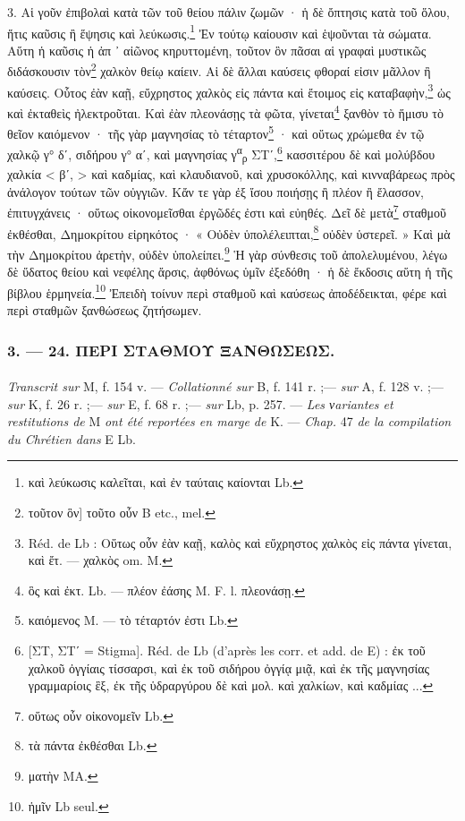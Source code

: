 \documentclass[a4paper, 11pt, oneside, polutonikogreek, french]{article}
\begin{document}
3. Αἱ γοῦν ἐπιβολαὶ κατὰ τῶν τοῦ θείου πάλιν ζωμῶν · ἡ δὲ ὄπτησις κατὰ τοῦ ὅλου, ἥτις καῦσις ἢ ἕψησις καὶ λεύκωσις.\footnote{καὶ λεύκωσις καλεῖται, καὶ ἐν ταύταις καίονται Lb.} Ἐν τούτῳ καίουσιν καὶ ἑψοῦνται τὰ σώματα. Αὕτη ἡ καῦσις ἡ ἀπ ᾽ αἰῶνος κηρυττομένη, τοῦτον ὃν πᾶσαι αἱ γραφαὶ μυστικῶς διδάσκουσιν τὸν\footnote{τοῦτον ὃν] τοῦτο οὖν B etc., mel.} χαλκὸν θείῳ καίειν. Αἱ δὲ ἄλλαι καύσεις φθοραί εἰσιν μᾶλλον ἢ καύσεις. Οὗτος ἐὰν καῇ, εὔχρηστος χαλκὸς εἰς πάντα καὶ ἔτοιμος εἰς καταβαφὴν,\footnote{Réd. de Lb : Οὕτως οὖν ἐὰν καῇ, καλὸς καὶ εὔχρηστος χαλκὸς εἰς πάντα γίνεται, καὶ ἔτ. --- χαλκὸς om. M.} ὡς καὶ ἐκταθεὶς ἠλεκτροῦται. Καὶ ἐὰν πλεονάσῃς τὰ φῶτα, γίνεται\footnote{ὃς καὶ ἐκτ. Lb. --- πλέον ἐάσης M. F. l. πλεονάσῃ.} ξανθὸν τὸ ἥμισυ τὸ θεῖον καιόμενον · τῆς γὰρ μαγνησίας τὸ τέταρτον\footnote{καιόμενος M. --- τὸ τέταρτόν ἐστι Lb.} · καὶ οὕτως χρώμεθα ἐν τῷ χαλκῷ γ° δʹ, σιδήρου γ° αʹ, καὶ μαγνησίας γ\textsuperscript{α}\textsubscript{ρ} ΣΤʹ,\footnote{[ΣΤ, ΣΤʹ = Stigma]. Réd. de Lb (d'après les corr. et add. de E) : ἐκ τοῦ χαλκοῦ ὀγγίαις τίσσαρσι, καὶ ἐκ τοῦ σιδήρου ὀγγίᾳ μιᾷ, καὶ ἐκ τῆς μαγνησίας γραμμαρίοις ἓξ, ἐκ τῆς ὑδραργύρου δὲ καὶ μολ. καὶ χαλκίων, καὶ καδμίας ...} κασσιτέρου δὲ καὶ μολύβδου χαλκία < βʹ, > καὶ καδμίας, καὶ κλαυδιανοῦ, καὶ χρυσοκόλλης, καὶ κινναβάρεως πρὸς ἀνάλογον τούτων τῶν οὐγγιῶν. Κἄν τε γὰρ ἐξ ἴσου ποιήσῃς ἢ πλέον ἢ ἔλασσον, ἐπιτυγχάνεις · οὕτως οἰκονομεῖσθαι ἐργῶδές ἐστι καὶ εὐηθές. Δεῖ δὲ μετὰ\footnote{οὕτως οὖν οἰκονομεῖν Lb.} σταθμοῦ ἐκθέσθαι, Δημοκρίτου εἰρηκότος · « Οὐδὲν ὑπολέλειπται,\footnote{τὰ πάντα ἐκθέσθαι Lb.} οὐδὲν ὑστερεῖ. » Καὶ μὰ τὴν Δημοκρίτου ἀρετὴν, οὐδὲν ὑπολείπει.\footnote{ματὴν MA.} Ἡ γὰρ σύνθεσις τοῦ ἀπολελυμένου, λέγω δὲ ὕδατος θείου καὶ νεφέλης ἄρσις, ἀφθόνως ὑμῖν ἐξεδόθη · ἡ δὲ ἔκδοσις αὕτη ἡ τῆς βίβλου ἑρμηνεία.\footnote{ἡμῖν Lb seul.} Ἐπειδὴ τοίνυν περὶ σταθμοῦ καὶ καύσεως ἀποδέδεικται, φέρε καὶ περὶ σταθμῶν ξανθώσεως ζητήσωμεν.

\bigskip
\centerline{\EightStarTaper}
\centerline{\EightStarTaper\EightStarTaper}
\bigskip

\subsubsection{3. --- 24. ΠΕΡΙ ΣΤΑΘΜΟΥ ΞΑΝΘΩΣΕΩΣ.}
\paragraph{}
\emph{Transcrit sur} M, f. 154 v. --- \emph{Collationné sur} B, f. 141 r. ;--- \emph{sur} A, f. 128 v. ;--- \emph{sur} K, f. 26 r. ;--- \emph{sur} E, f. 68 r. ;--- \emph{sur} Lb, p. 257. --- \emph{Les νariantes et restitutions de} M \emph{ont été reportées en marge de} K. --- \emph{Chap.} 47 \emph{de la compilation du Chrétien dans} E Lb.
\end{document}
